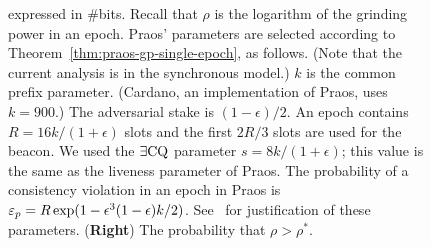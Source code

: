 \begin{figure}[!htb]
{    expressed in \#bits.  
    Recall that $\rho$ is the logarithm of the grinding power in an epoch.     
    Praos' parameters are selected according to Theorem~\ref{thm:praos-gp-single-epoch}, 
    as follows.
    (Note that the current analysis is in the synchronous model.)
    $k$ is the common prefix parameter. 
    (Cardano, an implementation of Praos, uses $k = 900$.) 
    The adversarial stake is $(1-\epsilon)/2$.
    An epoch contains $R = 16 k/(1+\epsilon)$ slots and the first $2R/3$ slots are used for the beacon. 
    We used the $\exists\mathrm{CQ}$ parameter $s = 8 k/(1+\epsilon)$; 
    this value is the same as the liveness parameter of Praos. 
    The probability of a consistency violation in an epoch in Praos is 
    $\mathsf{\varepsilon}_p = R \exp(1-\epsilon^3 (1-\epsilon)k/2) $. 
    See~\citet[Theorem 9]{Praos} for justification of these parameters. 
    (\textbf{Right}) The probability that $\rho > \rho^*$.
  }
  \label{fig:praos-beacon-single-epoch}
\end{figure}
